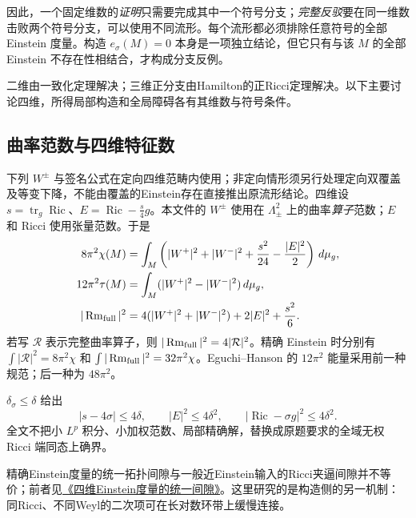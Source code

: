 \documentclass[UTF8,a4paper,11pt,fontset=fandol]{ctexart}
\numberwithin{equation}{section}
\theoremstyle{definition}
\newcommand{\Ric}{\operatorname{Ric}}
\newcommand{\Rm}{\operatorname{Rm}}
\newcommand{\tr}{\operatorname{tr}}
\newcommand{\dd}{\,d\mu_g}
\begin{document}
因此，一个固定维数的\emph{证明}只需要完成其中一个符号分支；\emph{完整反驳}要在同一维数击败两个符号分支，可以使用不同流形。每个流形都必须排除任意符号的全部 Einstein 度量。构造 $e_\sigma(M)=0$ 本身是一项独立结论，但它只有与该 $M$ 的全部 Einstein 不存在性相结合，才构成分支反例。

二维由一致化定理解决；三维正分支由Hamilton的正Ricci定理解决。以下主要讨论四维，所得局部构造和全局障碍各有其维数与符号条件。

\subsection{曲率范数与四维特征数}
下列 $W^\pm$ 与签名公式在定向四维范畴内使用；非定向情形须另行处理定向双覆盖及等变下降，不能由覆盖的Einstein存在直接推出原流形结论。四维设 $s=\tr_g\Ric$、$E=\Ric-\frac{s}{4}g$。本文件的 $W^\pm$ 使用在 $\Lambda^2_\pm$ 上的曲率\emph{算子}范数；$E$ 和 Ricci 使用张量范数。于是
\begin{align}
8\pi^2\chi(M)&=\int_M\left(|W^+|^2+|W^-|^2+\frac{s^2}{24}-\frac{|E|^2}{2}\right)\dd,\label{eq:CGB}\\
12\pi^2\tau(M)&=\int_M(|W^+|^2-|W^-|^2)\dd,\label{eq:signature}\\
|\Rm_{\rm full}|^2&=4(|W^+|^2+|W^-|^2)+2|E|^2+\frac{s^2}{6}.
\end{align}
若写 $\mathcal R$ 表示完整曲率算子，则 $|\Rm_{\rm full}|^2=4|\mathcal R|^2$。精确 Einstein 时分别有 $\int|\mathcal R|^2=8\pi^2\chi$ 和 $\int|\Rm_{\rm full}|^2=32\pi^2\chi$。Eguchi--Hanson 的 $12\pi^2$ 能量采用前一种规范；后一种为 $48\pi^2$。

$\delta_\sigma\le\delta$ 给出
\begin{equation}
 |s-4\sigma|\le4\delta,\qquad |E|^2\le4\delta^2,\qquad
 |\Ric-\sigma g|^2\le4\delta^2.
\end{equation}
全文不把小 $L^p$ 积分、小加权范数、局部精确解，替换成原题要求的全域无权 Ricci 端同态上确界。

精确Einstein度量的统一拓扑间隙与一般近Einstein输入的Ricci夹逼间隙并不等价；前者见\href{20260916_uniform_gap.tex}{《四维Einstein度量的统一间隙》}。这里研究的是构造侧的另一机制：同Ricci、不同Weyl的二次项可在长对数环带上缓慢连接。
\end{document}
